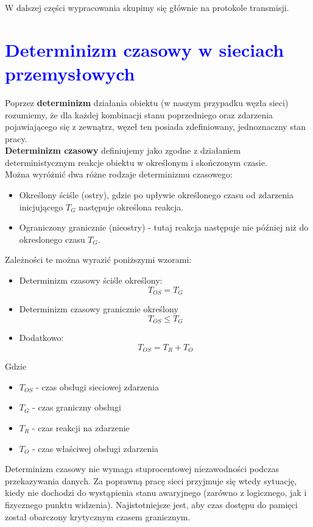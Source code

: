 \documentclass[a4paper,twoside]{article}
\begin{document}
W dalszej części wypracowania skupimy się głównie na protokole transmisji.

\section{\textcolor{blue}{Determinizm czasowy w sieciach przemysłowych}}

Poprzez \textbf{determinizm} działania obiektu (w naszym przypadku węzła sieci) rozumiemy, że dla każdej kombinacji stanu poprzedniego oraz zdarzenia pojawiającego się z zewnątrz, węzeł ten posiada zdefiniowany, jednoznaczny stan pracy. \\
\textbf{Determinizm czasowy} definiujemy jako zgodne z działaniem deterministycznym reakcje obiektu w określonym i skończonym czasie. \\
Można wyróżnić dwa różne rodzaje determinizmu czasowego:
\begin{itemize}
	\item Określony ściśle (ostry), gdzie po upływie określonego czasu od zdarzenia inicjującego $ T_G $ następuje określona reakcja.
	\item Ograniczony granicznie (nieostry) - tutaj reakcja następuje nie później niż do okreslonego czasu $ T_G $.
\end{itemize}
Zależności te można wyrazić poniższymi wzorami:
\begin{itemize}
	\item Determinizm czasowy ściśle określony:
	\begin{equation}
	T_{OS} = T_G
	\end{equation}
	\item Determinizm czasowy granicznie określony
	\begin{equation}
	T_{OS} \leq T_G
	\end{equation}
	\item Dodatkowo:
	\begin{equation}
	T_{OS} = T_R + T_O
	\end{equation}
\end{itemize}
Gdzie
\begin{itemize}
	\item $ T_{OS} $ - czas obsługi sieciowej zdarzenia
	\item $ T_G $ - czas graniczny obsługi
	\item $ T_R $ - czas reakcji na zdarzenie
	\item $ T_O $ - czas właściwej obsługi zdarzenia
\end{itemize}
Determinizm czasowy nie wymaga stuprocentowej niezawodności podczas przekazywania danych. Za poprawną pracę sieci przyjmuje się wtedy sytuację, kiedy nie dochodzi do wystąpienia stanu awaryjnego (zarówno z logicznego, jak i fizycznego punktu widzenia). Najistotniejsze jest, aby czas dostępu do pamięci został obarczony krytycznym czasem granicznym.\\
\end{document}
